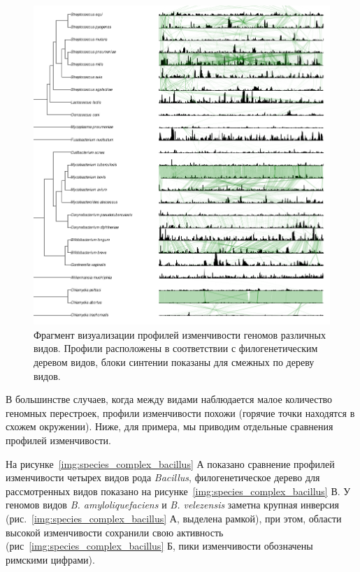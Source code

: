 \begin{figure}[!ht] 
  \center
    \includegraphics[width=\textwidth]{Dissertation/images/complexity/tree_fragment.png}
  \caption{Фрагмент визуализации профилей изменчивости геномов различных видов. Профили расположены в соответствии с филогенетическим деревом видов, блоки синтении показаны для смежных по дереву видов.   }
  \label{img:tree_fragment} 
\end{figure}

В большинстве случаев, когда между видами наблюдается малое количество геномных перестроек, профили изменчивости похожи (горячие точки находятся в схожем окружении). Ниже, для примера, мы приводим отдельные сравнения профилей изменчивости.

На рисунке~\ref{img:species_complex_bacillus} А показано сравнение профилей изменчивости четырех видов рода \textit{Bacillus}, филогенетическое дерево для рассмотренных видов показано на рисунке~\ref{img:species_complex_bacillus} В. У геномов видов \textit{B. amyloliquefaciens} и \textit{B. velezensis} заметна крупная инверсия (рис.~\ref{img:species_complex_bacillus} А, выделена рамкой), при этом, области высокой изменчивости сохранили свою активность  (рис~\ref{img:species_complex_bacillus} Б, пики изменчивости обозначены римскими цифрами). 

